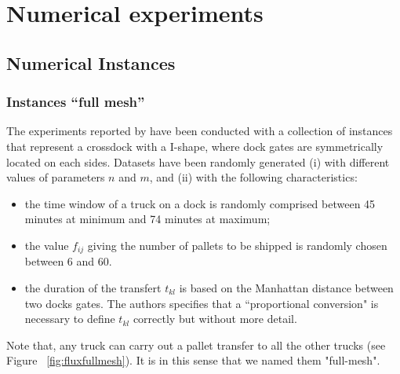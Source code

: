 \documentclass[preprint,12pt,authoryear]{elsarticle}
\begin{document}
\section{Numerical experiments} 
\label{sec:NumericalExperiments}

%
%
\subsection{Numerical Instances}

%
%
\subsubsection{Instances ``full mesh''}\label{sec:fullmesh}

The experiments reported by \citet{MIAO2009} have been conducted with a collection of instances that represent a crossdock with a I-shape, where dock gates are symmetrically located on each sides. Datasets have been randomly generated  (i) with different values of parameters $n$ and $m$, and (ii) with the following characteristics:
\begin{itemize}
    \item the time window of a truck on a dock is randomly comprised between 45 minutes at minimum and  74 minutes at maximum;
    \item the  value $f_{ij}$ giving the number of pallets to be shipped is randomly chosen between 6 and 60. %
    \item the duration of the transfert $t_{kl}$ is based on the Manhattan distance between two docks gates. The authors specifies that a ``proportional conversion" is necessary to define $t_{kl}$ correctly but without more detail. 
\end{itemize}
%

Note that, any truck can carry out a pallet transfer to all the other trucks (see Figure~ \ref{fig:fluxfullmesh}). It is in this sense that we named them "full-mesh". 
\vspace{-5mm}
\end{document}

